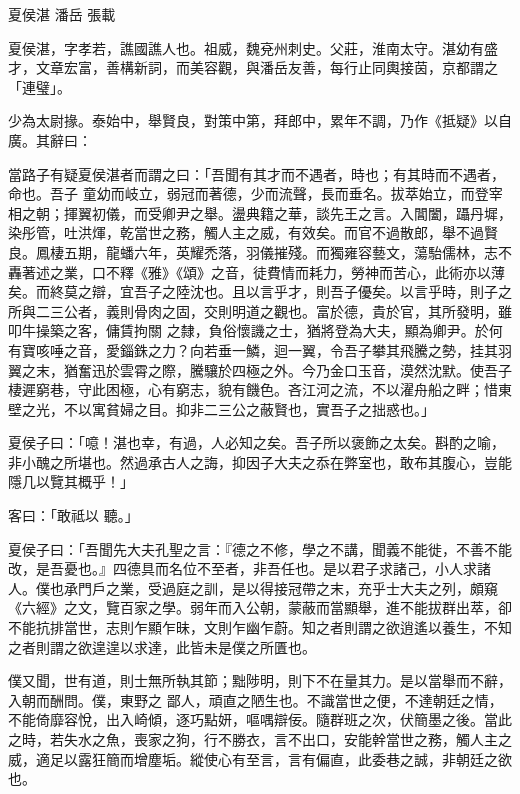 
\begin{pinyinscope}
夏侯湛
 潘岳
 張載



 夏侯湛，字孝若，譙國譙人也。祖威，魏兗州刺史。父莊，淮南太守。湛幼有盛才，文章宏富，善構新詞，而美容觀，與潘岳友善，每行止同輿接茵，京都謂之「連璧」。



 少為太尉掾。泰始中，舉賢良，對策中第，拜郎中，累年不調，乃作《抵疑》以自廣。其辭曰：



 當路子有疑夏侯湛者而謂之曰：「吾聞有其才而不遇者，時也；有其時而不遇者，命也。吾子
 童幼而岐立，弱冠而著德，少而流聲，長而垂名。拔萃始立，而登宰相之朝；揮翼初儀，而受卿尹之舉。盪典籍之華，談先王之言。入閶闔，躡丹墀，染彤管，吐洪煇，乾當世之務，觸人主之威，有效矣。而官不過散郎，舉不過賢良。鳳棲五期，龍蟠六年，英耀禿落，羽儀摧殘。而獨雍容藝文，蕩駘儒林，志不轟著述之業，口不釋《雅》《頌》之音，徒費情而耗力，勞神而苦心，此術亦以薄矣。而終莫之辯，宜吾子之陸沈也。且以言乎才，則吾子優矣。以言乎時，則子之所與二三公者，義則骨肉之固，交則明道之觀也。富於德，貴於官，其所發明，雖叩牛操築之客，傭賃拘關
 之隸，負俗懷譏之士，猶將登為大夫，顯為卿尹。於何有寶咳唾之音，愛錙銖之力？向若垂一鱗，迴一翼，令吾子攀其飛騰之勢，挂其羽翼之末，猶奮迅於雲霄之際，騰驤於四極之外。今乃金口玉音，漠然沈默。使吾子棲遲窮巷，守此困極，心有窮志，貌有饑色。吝江河之流，不以濯舟船之畔；惜東壁之光，不以寓貧婦之目。抑非二三公之蔽賢也，實吾子之拙惑也。」



 夏侯子曰：「噫！湛也幸，有過，人必知之矣。吾子所以褒飾之太矣。斟酌之喻，非小醜之所堪也。然過承古人之誨，抑因子大夫之忝在弊室也，敢布其腹心，豈能隱几以覽其概乎！」



 客曰：「敢祗以
 聽。」



 夏侯子曰：「吾聞先大夫孔聖之言：『德之不修，學之不講，聞義不能徙，不善不能改，是吾憂也。』四德具而名位不至者，非吾任也。是以君子求諸己，小人求諸人。僕也承門戶之業，受過庭之訓，是以得接冠帶之末，充乎士大夫之列，頗窺《六經》之文，覽百家之學。弱年而入公朝，蒙蔽而當顯舉，進不能拔群出萃，卻不能抗排當世，志則乍顯乍昧，文則乍幽乍蔚。知之者則謂之欲逍遙以養生，不知之者則謂之欲遑遑以求達，此皆未是僕之所匱也。



 僕又聞，世有道，則士無所執其節；黜陟明，則下不在量其力。是以當舉而不辭，入朝而酬問。僕，東野之
 鄙人，頑直之陋生也。不識當世之便，不達朝廷之情，不能倚靡容悅，出入崎傾，逐巧點妍，嘔喁辯佞。隨群班之次，伏簡墨之後。當此之時，若失水之魚，喪家之狗，行不勝衣，言不出口，安能幹當世之務，觸人主之威，適足以露狂簡而增塵垢。縱使心有至言，言有偏直，此委巷之誠，非朝廷之欲也。




\end{pinyinscope}

